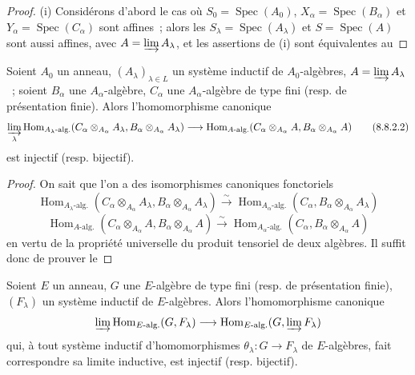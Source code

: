 \begin{proof}
(i) Considérons d'abord le cas où $S_0=\operatorname{Spec}(A_0)$,
$X_\alpha=\operatorname{Spec}(B_\alpha)$ et
$Y_\alpha=\operatorname{Spec}(C_\alpha)$ sont affines~; alors les
$S_\lambda=\operatorname{Spec}(A_\lambda)$ et $S=\operatorname{Spec}(A)$ sont
aussi affines, avec $A=\varinjlim A_\lambda$, et les assertions de (i) sont
équivalentes au
\end{proof}

\begin{lemma}[8.8.2.1]
\label{IV.8.8.2.1-fr}
Soient $A_0$ un anneau, $(A_\lambda)_{\lambda\in L}$ un système inductif de
$A_0$-algèbres, $A=\varinjlim A_\lambda$~; soient $B_\alpha$ une
$A_\alpha$-algèbre, $C_\alpha$ une $A_\alpha$-algèbre de type fini (resp. de
présentation finie). Alors l'homomorphisme canonique
\begin{equation}
\varinjlim_\lambda
\operatorname{Hom}_{A_\lambda\text{-alg.}}
  (C_\alpha\otimes_{A_\alpha}A_\lambda,
   B_\alpha\otimes_{A_\alpha}A_\lambda)
\longrightarrow
\operatorname{Hom}_{A\text{-alg.}}
  (C_\alpha\otimes_{A_\alpha}A,
   B_\alpha\otimes_{A_\alpha}A)
\tag{8.8.2.2}\label{IV.8.8.2.2-fr}
\end{equation}
est injectif (resp. bijectif).
\end{lemma}

\begin{proof}
On sait que l'on a des isomorphismes canoniques fonctoriels
\[
\operatorname{Hom}_{A_\lambda\text{-alg.}}
 (C_\alpha\otimes_{A_\alpha}A_\lambda,
  B_\alpha\otimes_{A_\alpha}A_\lambda)
\xrightarrow{\sim}
\operatorname{Hom}_{A_\alpha\text{-alg.}}
 (C_\alpha,B_\alpha\otimes_{A_\alpha}A_\lambda)
\]
\[
\operatorname{Hom}_{A\text{-alg.}}
 (C_\alpha\otimes_{A_\alpha}A,
  B_\alpha\otimes_{A_\alpha}A)
\xrightarrow{\sim}
\operatorname{Hom}_{A_\alpha\text{-alg.}}
 (C_\alpha,B_\alpha\otimes_{A_\alpha}A)
\]
en vertu de la propriété universelle du produit tensoriel de deux algèbres. Il
suffit donc de prouver le
\end{proof}

\begin{lemma}[8.8.2.3]
\label{IV.8.8.2.3-fr}
Soient $E$ un anneau, $G$ une $E$-algèbre de type fini (resp. de présentation
finie), $(F_\lambda)$ un système inductif de $E$-algèbres. Alors
l'homomorphisme canonique
\[
\varinjlim\operatorname{Hom}_{E\text{-alg.}}(G,F_\lambda)
\longrightarrow
\operatorname{Hom}_{E\text{-alg.}}(G,\varinjlim F_\lambda)
\]
qui, à tout système inductif d'homomorphismes
$\theta_\lambda:G\to F_\lambda$ de $E$-algèbres, fait correspondre sa limite
inductive, est injectif (resp. bijectif).
\end{lemma}

